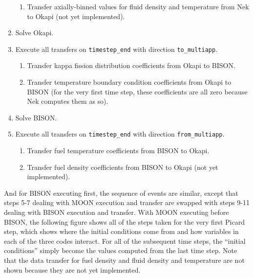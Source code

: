 \documentclass[10pt]{article}
\numberwithin{equation}{section} %
\begin{document}
\begin{enumerate}
\begin{enumerate}
	\item Transfer axially-binned values for fluid density and temperature from Nek to Okapi (not yet implemented).
	\end{enumerate}
\item Solve Okapi.
\item Execute all transfers on {\tt timestep\_end} with direction {\tt to\_multiapp}.
	\begin{enumerate}
	\item Transfer kappa fission distribution coefficients from Okapi to BISON.
	\item Transfer temperature boundary condition coefficients from Okapi to BISON (for the very first time step, these coefficients are all zero because Nek computes them as so).
	\end{enumerate}
\item Solve BISON.
\item Execute all transfers on {\tt timestep\_end} with direction {\tt from\_multiapp}.
	\begin{enumerate}
	\item Transfer fuel temperature coefficients from BISON to Okapi.
	\item Transfer fuel density coefficients from BISON to Okapi (not yet implemented).
	\end{enumerate}
\end{enumerate}

And for BISON executing first, the sequence of events are similar, except that steps 5-7 dealing with MOON execution and transfer are swapped with steps 9-11 dealing with BISON execution and transfer. With MOON executing before BISON, the following figure shows all of the steps taken for the very first Picard step, which shows where the initial conditions come from and how variables in each of the three codes interact. For all of the subsequent time steps, the ``initial conditions'' simply become the values computed from the last time step. Note that the data transfer for fuel density and fluid density and temperature are not shown because they are not yet implemented.
\end{document}

